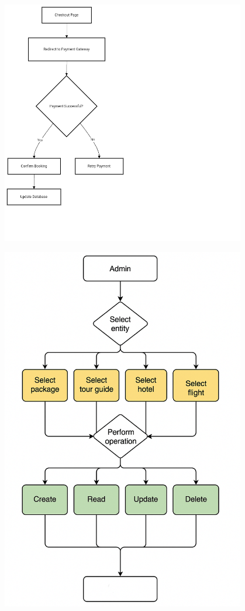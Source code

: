 \vspace{0.5cm}
\begin{center}
\includegraphics[width=0.8\textwidth]{./figures/Activity Diagram/3_acivity.png} %
\end{center}
\vspace{0.5cm}

\vspace{0.5cm}
\begin{center}
\includegraphics[width=0.8\textwidth]{./figures/Activity Diagram/4_crud_activity.png} %
\end{center}
\vspace{0.5cm}


